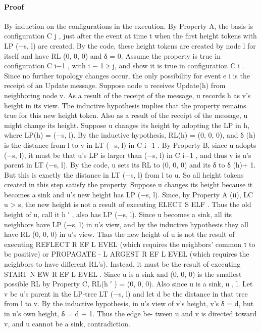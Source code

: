 \documentclass{article}
\begin{document}
\paragraph{Proof}
By induction on the configurations in the execution.
By Property A, the basis is configuration C j , just after the
event at time t when the first height tokens with LP (−s, l)
are created. By the code, these height tokens are created by
node l for itself and have RL (0, 0, 0) and δ = 0.
Assume the property is true in configuration C i−1 , with
i − 1 ≥ j, and show it is true in configuration C i . Since
no further topology changes occur, the only possibility for
event e i is the receipt of an Update message. Suppose node
u receives Update(h) from neighboring node v.
As a result of the receipt of the message, u records h as
v’s height in its view. The inductive hypothesis implies that
the property remains true for this new height token.
Also as a result of the receipt of the message, u might
change its height.
Suppose u changes its height by adopting the LP in
h, where LP(h) = (−s, l). By the inductive hypothesis,
RL(h) = (0, 0, 0), and δ (h) is the distance from l to v in
LT (−s, l) in C i−1 . By Property B, since u adopts (−s, l), it
must be that u’s LP is larger than (−s, l) in C i−1 , and thus
v is u’s parent in LT (−s, l). By the code, u sets its RL to
(0, 0, 0) and its δ to δ (h)+ 1. But this is exactly the distance
in LT (−s, l) from l to u. So all height tokens created in this
step satisfy the property.
Suppose u changes its height because it becomes a sink
and u’s new height has LP (−s, l). Since, by Property A
(ii), LC u > s, the new height is not a result of executing
ELECT S ELF . Thus the old height of u, call it h ′ , also has LP
(−s, l). Since u becomes a sink, all its neighbors have LP
(−s, l) in u’s view, and by the inductive hypothesis they all
have RL (0, 0, 0) in u’s view. Thus the new height of u is not
the result of executing REFLECT R EF L EVEL (which requires
the neighbors’ common τ to be positive) or PROPAGATE -
L ARGEST R EF L EVEL (which requires the neighbors to have
different RL’s). Instead, it must be the result of executing
START N EW R EF L EVEL . Since u is a sink and (0, 0, 0) is the
smallest possible RL by Property C, RL(h ′ ) = (0, 0, 0). Also
since u is a sink, u , l. Let v be u’s parent in the LP-tree
LT (−s, l) and let d be the distance in that tree from l to v.
By the inductive hypothesis, in u’s view of v’s height, v’s
δ = d, but in u’s own height, δ = d + 1. Thus the edge be-
tween u and v is directed toward v, and u cannot be a sink,
contradiction.
\end{document}
